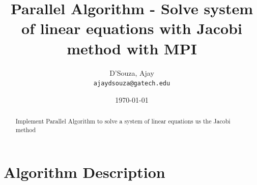 \documentclass[twoside,11pt]{article}\usepackage{amsmath,amsfonts,amsthm,fullpage}
\title{
Parallel Algorithm - Solve system of linear equations with Jacobi method with MPI
}
\author{
  D'Souza, Ajay\\
  \texttt{ajaydsouza@gatech.edu}
}
\date{\today}
\begin{document}
\maketitle



\begin{abstract}
Implement Parallel Algorithm to solve a system of linear equations us the Jacobi method
\end{abstract}

\pagebreak
\tableofcontents

\pagebreak
\listoffigures


\pagebreak

%
%
\section{Algorithm Description}
\label{algorithm}
\end{document}

